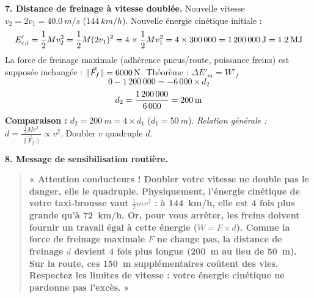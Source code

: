 \documentclass[11pt]{article}
\begin{document}
\begin{exoresolu}
\noindent \textbf{7. Distance de freinage à vitesse doublée.}
Nouvelle vitesse $v_2 = 2 v_1 = \SI{40,0}{m/s}$ ($\SI{144}{km/h}$).
Nouvelle énergie cinétique initiale :
\[ E'_{c,i} = \frac{1}{2} M v_2^2 = \frac{1}{2} M (2v_1)^2 = 4 \times \frac{1}{2} M v_1^2 = 4 \times 300\,000 = \textbf{\SI{1\,200\,000}{J}} = \textbf{\SI{1,2}{MJ}} \]
La force de freinage maximale (adhérence pneus/route, puissance freins) est supposée inchangée : $\|\vec{F}_f\| = \SI{6\,000}{N}$.
Théorème : $\Delta E'_m = W'_f$
\[ 0 - 1\,200\,000 = - 6\,000 \times d_2 \]
\[ d_2 = \frac{1\,200\,000}{6\,000} = \textbf{\SI{200}{m}} \]
\textbf{Comparaison :} $d_2 = \SI{200}{m} = 4 \times d_1$ ($d_1 = \SI{50}{m}$).
\emph{Relation générale :} $d = \frac{\frac{1}{2} M v^2}{\|\vec{F}_f\|} \propto v^2$. Doubler $v$ quadruple $d$.

\noindent \textbf{8. Message de sensibilisation routière.}
\begin{quote}
\textbf{« Attention conducteurs ! Doubler votre vitesse ne double pas le danger, elle le quadruple.
Physiquement, l'énergie cinétique de votre taxi-brousse vaut $\frac{1}{2}mv^2$ : à \SI{144}{km/h}, elle est \textbf{4 fois plus grande} qu'à \SI{72}{km/h}. Or, pour vous arrêter, les freins doivent fournir un travail égal à cette énergie ($W = F \times d$). Comme la force de freinage maximale $F$ ne change pas, la distance de freinage $d$ devient \textbf{4 fois plus longue} (\SI{200}{m} au lieu de \SI{50}{m}). Sur la route, ces \SI{150}{m} supplémentaires coûtent des vies. Respectez les limites de vitesse : votre énergie cinétique ne pardonne pas l'excès. »}
\end{quote}
\end{exoresolu}
\end{document}
